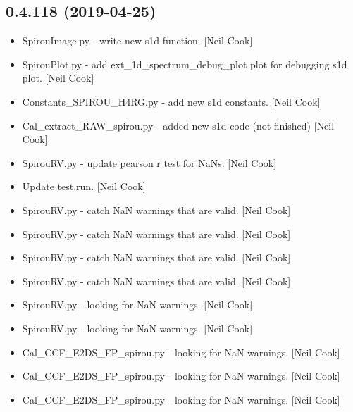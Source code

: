 \documentclass[a4paper,10pt,english]{report}
\begin{document}
\subsection{0.4.118 (2019-04-25)}
\label{\detokenize{misc/changelog:id141}}\begin{itemize}
\item {} 
SpirouImage.py - write new s1d function. {[}Neil Cook{]}

\item {} 
SpirouPlot.py - add ext\_1d\_spectrum\_debug\_plot plot for debugging s1d
plot. {[}Neil Cook{]}

\item {} 
Constants\_SPIROU\_H4RG.py - add new s1d constants. {[}Neil Cook{]}

\item {} 
Cal\_extract\_RAW\_spirou.py - added new s1d code (not finished) {[}Neil
Cook{]}

\item {} 
SpirouRV.py - update pearson r test for NaNs. {[}Neil Cook{]}

\item {} 
Update test.run. {[}Neil Cook{]}

\item {} 
SpirouRV.py - catch NaN warnings that are valid. {[}Neil Cook{]}

\item {} 
SpirouRV.py - catch NaN warnings that are valid. {[}Neil Cook{]}

\item {} 
SpirouRV.py - catch NaN warnings that are valid. {[}Neil Cook{]}

\item {} 
SpirouRV.py - catch NaN warnings that are valid. {[}Neil Cook{]}

\item {} 
SpirouRV.py - looking for NaN warnings. {[}Neil Cook{]}

\item {} 
SpirouRV.py - looking for NaN warnings. {[}Neil Cook{]}

\item {} 
Cal\_CCF\_E2DS\_FP\_spirou.py - looking for NaN warnings. {[}Neil Cook{]}

\item {} 
Cal\_CCF\_E2DS\_FP\_spirou.py - looking for NaN warnings. {[}Neil Cook{]}

\item {} 
Cal\_CCF\_E2DS\_FP\_spirou.py - looking for NaN warnings. {[}Neil Cook{]}


\end{itemize}
\end{document}
